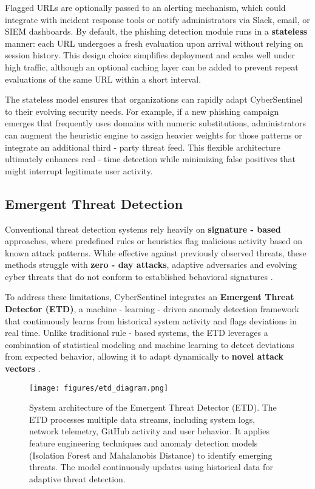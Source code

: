 \documentclass{article}
\begin{document}
Flagged URLs are optionally passed to an alerting mechanism, which could integrate with incident response tools or notify administrators via Slack, email, or SIEM dashboards. By default, the phishing detection module runs in a \textbf{stateless} manner: each URL undergoes a fresh evaluation upon arrival without relying on session history. This design choice simplifies deployment and scales well under high traffic, although an optional caching layer can be added to prevent repeat evaluations of the same URL within a short interval.

The stateless model ensures that organizations can rapidly adapt CyberSentinel to their evolving security needs. For example, if a new phishing campaign emerges that frequently uses domains with numeric substitutions, administrators can augment the heuristic engine to assign heavier weights for those patterns or integrate an additional third - party threat feed. This flexible architecture ultimately enhances real - time detection while minimizing false positives that might interrupt legitimate user activity.

\subsection{Emergent Threat Detection}
Conventional threat detection systems rely heavily on \textbf{signature - based} approaches, where predefined rules or heuristics flag malicious activity based on known attack patterns. While effective against previously observed threats, these methods struggle with \textbf{zero - day attacks}, adaptive adversaries and evolving cyber threats that do not conform to established behavioral signatures \cite{papernot2016limitations}. 

To address these limitations, CyberSentinel integrates an \textbf{Emergent Threat Detector (ETD)}, a machine - learning - driven anomaly detection framework that continuously learns from historical system activity and flags deviations in real time. Unlike traditional rule - based systems, the ETD leverages a combination of statistical modeling and machine learning to detect deviations from expected behavior, allowing it to adapt dynamically to \textbf{novel attack vectors} \cite{biggio2013evasion}.

\begin{figure}
    \centering
    \texttt{[image: figures/etd\_diagram.png]}
    \caption{System architecture of the Emergent Threat Detector (ETD). The ETD processes multiple data streams, including system logs, network telemetry, GitHub activity and user behavior. It applies feature engineering techniques and anomaly detection models (Isolation Forest and Mahalanobis Distance) to identify emerging threats. The model continuously updates using historical data for adaptive threat detection.}
    \label{fig:etd_architecture}
\end{figure}
\end{document}
